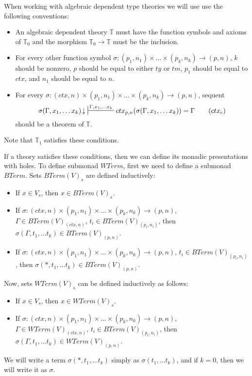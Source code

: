 \documentclass[reqno]{amsart}
\newcommand{\axtag}[1]{\label{ax:#1} \tag{#1}}
\theoremstyle{definition}
\theoremstyle{remark}
\numberwithin{figure}{section}
\begin{document}
When working with algebraic dependent type theories we will use use the following conventions:
\begin{itemize}
\item An algebraic dependent theory $\mathbb{T}$ must have the function symbols and axioms of $\mathbb{T}_0$ and the morphism $\mathbb{T}_0 \to \mathbb{T}$ must be the inclusion.
\item For every other function symbol $\sigma : (p_1,n_1) \times \ldots \times (p_k,n_k) \to (p,n)$,
    $k$ should be nonzero, $p$ should be equal to either $ty$ or $tm$, $p_1$ should be equal to $ctx$, and $n_1$ should be equal to $n$.
\item For every $\sigma : (ctx,n) \times (p_1,n_1) \times \ldots \times (p_k,n_k) \to (p,n)$, sequent
\begin{equation}
\sigma(\Gamma, x_1, \ldots x_k)\!\downarrow\ \sststile{}{\Gamma, x_1, \ldots x_k} ctx_{p,n}(\sigma(\Gamma, x_1, \ldots x_k)) = \Gamma \axtag{$ctx_c$}
\end{equation}
should be a theorem of $\mathbb{T}$.
\end{itemize}
Note that $\mathbb{T}_1$ satisfies these conditions.

If a theory satisfies these conditions, then we can define its monadic presentations with holes.
To define submonad $WTerm$, first we need to define a submonad $BTerm$.
Sets $BTerm(V)_s$ are defined inductively:
\begin{itemize}
\item If $x \in V_s$, then $x \in BTerm(V)_s$.
\item If $\sigma : (ctx,n) \times (p_1,n_1) \times \ldots \times (p_k,n_k) \to (p,n)$, $\Gamma \in BTerm(V)_{(ctx,n)}$, $t_i \in BTerm(V)_{(p_i,n_i)}$,
    then $\sigma(\Gamma, t_1, \ldots t_k) \in BTerm(V)_{(p,n)}$.
\item If $\sigma : (ctx,n) \times (p_1,n_1) \times \ldots \times (p_k,n_k) \to (p,n)$, $t_i \in BTerm(V)_{(p_i,n_i)}$, then $\sigma(*, t_1, \ldots t_k) \in BTerm(V)_{(p,n)}$.
\end{itemize}
Now, sets $WTerm(V)_s$ can be defined inductively as follows:
\begin{itemize}
\item If $x \in V_s$, then $x \in WTerm(V)_s$.
\item If $\sigma : (ctx,n) \times (p_1,n_1) \times \ldots \times (p_k,n_k) \to (p,n)$, $\Gamma \in WTerm(V)_{(ctx,n)}$, $t_i \in BTerm(V)_{(p_i,n_i)}$,
    then $\sigma(\Gamma, t_1, \ldots t_k) \in WTerm(V)_{(p,n)}$.
\end{itemize}
We will write a term $\sigma(*, t_1, \ldots t_k)$ simply as $\sigma(t_1, \ldots t_k)$, and if $k = 0$, then we will write it as $\sigma$.
\end{document}
